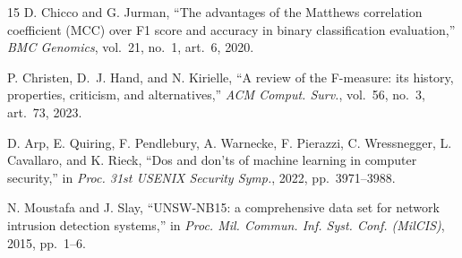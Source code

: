 \documentclass[runningheads]{llncs}
\begin{document}
\begin{thebibliography}{15}
D. Chicco and G. Jurman, ``The advantages of the Matthews correlation
  coefficient (MCC) over F1 score and accuracy in binary classification
  evaluation,'' \emph{BMC Genomics}, vol.~21, no.~1, art.~6, 2020.

P. Christen, D.~J. Hand, and N. Kirielle, ``A review of the F-measure: its
  history, properties, criticism, and alternatives,'' \emph{ACM Comput.
  Surv.}, vol.~56, no.~3, art.~73, 2023.

D. Arp, E. Quiring, F. Pendlebury, A. Warnecke, F. Pierazzi, C. Wressnegger,
  L. Cavallaro, and K. Rieck, ``Dos and don'ts of machine learning in
  computer security,'' in \emph{Proc. 31st USENIX Security Symp.}, 2022,
  pp.~3971--3988.

N. Moustafa and J. Slay,
``UNSW-NB15: a comprehensive data set for network intrusion detection
  systems,'' in \emph{Proc. Mil. Commun. Inf. Syst. Conf. (MilCIS)},
  2015, pp.~1--6.

%

\end{thebibliography}
\end{document}
